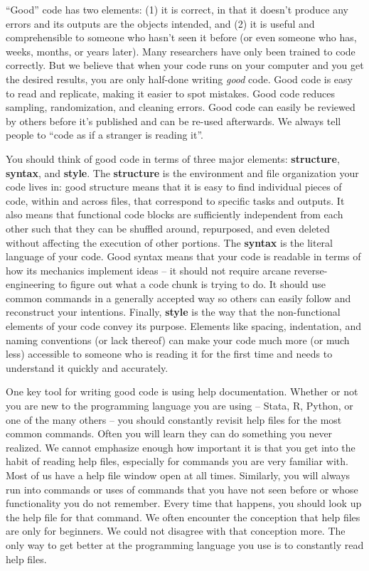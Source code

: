 ``Good'' code has two elements: 
(1) it is correct, in that it doesn't produce any errors
and its outputs are the objects intended,
and (2) it is useful and comprehensible 
to someone who hasn't seen it before
(or even someone who has, weeks, months, or years later).
Many researchers have only been trained to code correctly.
But we believe that when your code runs on your computer 
and you get the desired results,
you are only half-done writing \textit{good} code.
Good code is easy to read and replicate, 
making it easier to spot mistakes.
Good code reduces sampling, randomization, and cleaning errors.
Good code can easily be reviewed by others 
before it's published and can be re-used afterwards.
We always tell people to ``code as if a stranger is reading it''.

You should think of good code in terms of three major elements:
\textbf{structure}, \textbf{syntax}, and \textbf{style}.
The \textbf{structure} is the environment 
and file organization your code lives in:
good structure means that it is easy to find individual pieces of code,
within and across files,
that correspond to specific tasks and outputs.
It also means that functional code blocks 
are sufficiently independent from each other
such that they can be shuffled around, repurposed, 
and even deleted without affecting the execution of other portions.
The \textbf{syntax} is the literal language of your code.
Good syntax means that your code is readable
in terms of how its mechanics implement ideas --
it should not require arcane reverse-engineering
to figure out what a code chunk is trying to do.
It should use common commands in a generally accepted way
so others can easily follow and reconstruct your intentions.
Finally, \textbf{style} is the way 
that the non-functional elements of your code convey its purpose.
Elements like spacing, indentation, 
and naming conventions (or lack thereof) 
can make your code much more
(or much less) accessible to someone 
who is reading it for the first time
and needs to understand it quickly and accurately.

One key tool for writing good code is using help documentation.
Whether or not you are new to the programming language you are using 
-- Stata, R, Python, or one of the many others --
you should constantly revisit help files for the most common commands.
Often you will learn they can do something you never realized.
We cannot emphasize enough how important it is
that you get into the habit of reading help files,
especially for commands you are very familiar with.
Most of us have a help file window open at all times.
Similarly, you will always run into commands or uses of commands that
you have not seen before or whose functionality you do not remember.
Every time that happens,
you should look up the help file for that command.
We often encounter the conception that help files are only for beginners.
We could not disagree with that conception more.
The only way to get better at the programming language you use
is to constantly read help files.

